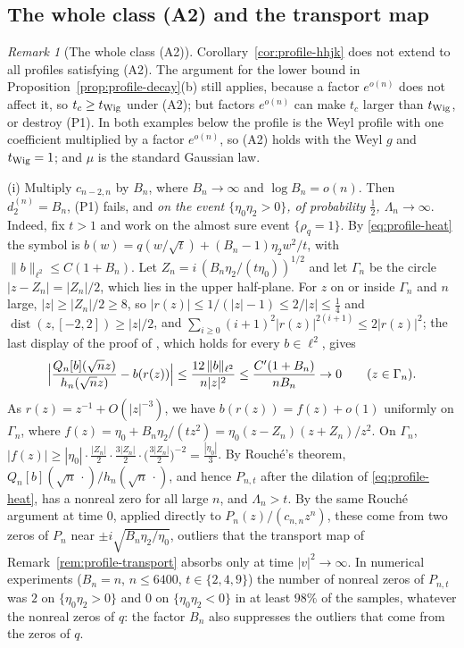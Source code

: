 \documentclass[11pt]{amsart}
\theoremstyle{definition}
\theoremstyle{remark}
\newtheorem{remark}[theorem]{Remark}
\numberwithin{equation}{section}
\DeclareMathOperator{\dist}{dist}
\begin{document}
\subsection{The whole class (A2) and the transport map}\label{subsec:A2}

\begin{remark}[The whole class (A2)]\label{rem:profile-A2}
Corollary~\ref{cor:profile-hhjk} does not extend to all profiles satisfying (A2). The argument for the lower bound in Proposition~\ref{prop:profile-decay}(b) still applies, because a factor $e^{o(n)}$ does not affect it, so $t_c\ge t_{\rm Wig}$ under (A2); but factors $e^{o(n)}$ can make $t_c$ larger than $t_{\rm Wig}$, or destroy (P1). In both examples below the profile is the Weyl profile with one coefficient multiplied by a factor $e^{o(n)}$, so (A2) holds with the Weyl $g$ and $t_{\rm Wig}=1$; and $\mu$ is the standard Gaussian law.

(i) Multiply $c_{n-2,n}$ by $B_n$, where $B_n\to\infty$ and $\log B_n=o(n)$. Then $d^{(n)}_2=B_n$, (P1) fails, and \emph{on the event $\{\eta_0\eta_2>0\}$, of probability $\frac12$, $\Lambda_n\to\infty$}. Indeed, fix $t>1$ and work on the almost sure event $\{\rho_q=1\}$. By \eqref{eq:profile-heat} the symbol is $b(w)=q(w/\sqrt t)+(B_n-1)\eta_2w^2/t$, with $\|b\|_{\ell^2}\le C(1+B_n)$. Let $Z_n=i\,(B_n\eta_2/(t\eta_0))^{1/2}$ and let $\Gamma_n$ be the circle $|z-Z_n|=|Z_n|/2$, which lies in the upper half-plane. For $z$ on or inside $\Gamma_n$ and $n$ large, $|z|\ge|Z_n|/2\ge8$, so $|r(z)|\le1/(|z|-1)\le2/|z|\le\frac14$ and $\dist(z,[-2,2])\ge|z|/2$, and $\sum_{i\ge0}(i+1)^2|r(z)|^{2(i+1)}\le2|r(z)|^2$; the last display of the proof of \cite[Proposition~\ref{M-prop:exterior}]{Main}, which holds for every $b\in\ell^2$, gives
\[
\Bigl|\frac{Q_n[b](\sqrt nz)}{h_n(\sqrt nz)}-b(r(z))\Bigr|\le\frac{12\,\|b\|_{\ell^2}}{n|z|^2}\le\frac{C'(1+B_n)}{nB_n}\to0\qquad(z\in\Gamma_n).
\]
As $r(z)=z^{-1}+O(|z|^{-3})$, we have $b(r(z))=f(z)+o(1)$ uniformly on $\Gamma_n$, where $f(z)=\eta_0+B_n\eta_2/(tz^2)=\eta_0(z-Z_n)(z+Z_n)/z^2$. On $\Gamma_n$, $|f(z)|\ge|\eta_0|\cdot\frac{|Z_n|}2\cdot\frac{3|Z_n|}2\cdot\bigl(\frac{3|Z_n|}2\bigr)^{-2}=\frac{|\eta_0|}3$. By Rouch\'e's theorem, $Q_n[b](\sqrt n\,\cdot)/h_n(\sqrt n\,\cdot)$, and hence $P_{n,t}$ after the dilation of \eqref{eq:profile-heat}, has a nonreal zero for all large $n$, and $\Lambda_n>t$. By the same Rouch\'e argument at time $0$, applied directly to $P_n(z)/(c_{n,n}z^n)$, these come from two zeros of $P_n$ near $\pm i\sqrt{B_n\eta_2/\eta_0}$, outliers that the transport map of Remark~\ref{rem:profile-transport} absorbs only at time $|v|^2\to\infty$. In numerical experiments ($B_n=n$, $n\le6400$, $t\in\{2,4,9\}$) the number of nonreal zeros of $P_{n,t}$ was $2$ on $\{\eta_0\eta_2>0\}$ and $0$ on $\{\eta_0\eta_2<0\}$ in at least $98\%$ of the samples, whatever the nonreal zeros of $q$: the factor $B_n$ also suppresses the outliers that come from the zeros of $q$.


\end{remark}
\end{document}
